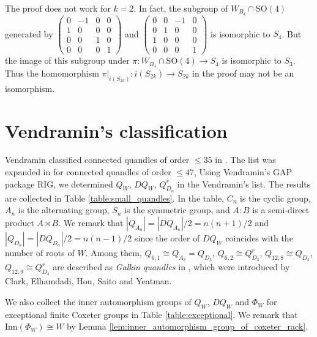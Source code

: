 \documentclass{amsart}
\theoremstyle{definition}
\theoremstyle{remark}
\numberwithin{equation}{section}
\begin{document}
The proof does not work for $k = 2$.
In fact, the subgroup of $W_{B_4} \cap \mathrm{SO}(4)$ generated by 
$\begin{pmatrix} 
0 & -1 & 0 & 0 \\
1 & 0 & 0 & 0 \\
0 & 0 & 1 & 0 \\
0 & 0 & 0 & 1
\end{pmatrix}$
and 
$\begin{pmatrix} 
0 & 0 & -1 & 0 \\
0 & 1 & 0 & 0 \\
1 & 0 & 0 & 0 \\
0 & 0 & 0 & 1
\end{pmatrix}$
is isomorphic to $S_4$. 
But the image of this subgroup under $\pi : W_{B_4} \cap \mathrm{SO}(4) \to S_4$ 
is isomorphic to $S_3$. 
Thus the homomorphism $\pi |_{i(S_{2k})} : i(S_{2k}) \to S_{2k}$ in the proof 
may not be an isomorphism.


\section{Vendramin's classification}
\label{sec:vendramin's_classification}
Vendramin classified connected quandles of order $\leq 35$ in \cite{Vendramin}.
The list was expanded in \cite{RIG} for connected quandles of order $\leq 47$, 
Using Vendramin's GAP package RIG, 
we determined $Q_{W}$, $DQ_{W}$, $Q^r_{D_n}$ in the Vendramin's list.
The results are collected in Table \ref{table:small_quandles}.
In the table, $C_n$ is the cyclic group, $A_n$ is the alternating group, 
$S_n$ is the symmetric group, and $A : B$ is a semi-direct product $A \rtimes B$.
We remark that $|Q_{A_n}| = |DQ_{A_n}|/2 = n(n+1)/2$ 
and $|Q_{D_n}| = |DQ_{D_n}|/2 = n(n-1)/2$
since the order of $DQ_W$ coincides with the number of roots of $W$.
Among them, 
$Q_{6,1} \cong Q_{A_3} = Q_{D_3}$, $Q_{6,2} \cong Q^r_{D_3}$, 
$Q_{12,8} \cong Q_{D_4}$, $Q_{12,9} \cong Q^r_{D_4}$
are described as \emph{Galkin quandles} in \cite[Table 1]{CEHSY}, 
which were introduced by Clark, Elhamdadi, Hou, Saito and Yeatman.

We also collect the inner automorphism groups of $Q_W$, $DQ_W$ and $\Phi_W$
for exceptional finite Coxeter groups in Table \ref{table:exceptional}. 
We remark that $\mathrm{Inn} (\Phi_{W}) \cong W$ 
by Lemma \ref{lem:inner_automorphism_group_of_coxeter_rack}.

% 
%
\end{document}
